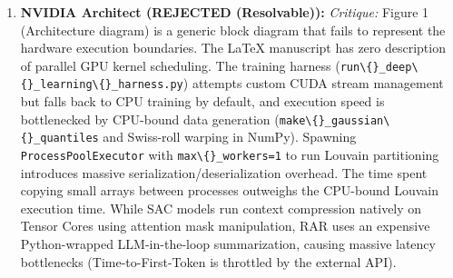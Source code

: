 \begin{enumerate}[leftmargin=1.5em, itemsep=6pt]
        \emph{Resolution:} 
        \begin{itemize}[leftmargin=1em,itemsep=1pt]
          \item Formalized the Knowledge Map as a relational multigraph schema $G=(V, E, \Phi)$ in Section 3.2 of the manuscript.
          \item Clarified that NetworkX is used for local memory consolidation within HPO loops, which is highly efficient. Introduced a sliding-window queue (\texttt{collections.deque(maxlen=MAX\textbackslash\{\}\_TRIAL\textbackslash\{\}\_MEMORY)}) to prevent quadratic memory scaling.
          \item Offloaded Louvain graph partition processing and file persistence to background threads via \texttt{asyncio.to\textbackslash\{\}\_thread()}, resolving event-loop starvation.
          \item Verified end-to-end with the full $N{=}10$, 60-cycle pilot campaign ($p=0.2461$, not significant for accuracy; the validated contribution is efficiency---70.0\% fewer tokens at accuracy parity).
        \end{itemize}

  \item \textbf{NVIDIA Architect (REJECTED (Resolvable)):}
        \emph{Critique:} Figure 1 (Architecture diagram) is a generic block diagram that fails to represent the hardware execution boundaries. The LaTeX manuscript has zero description of parallel GPU kernel scheduling. The training harness (\texttt{run\textbackslash\{\}\_deep\textbackslash\{\}\_learning\textbackslash\{\}\_harness.py}) attempts custom CUDA stream management but falls back to CPU training by default, and execution speed is bottlenecked by CPU-bound data generation (\texttt{make\textbackslash\{\}\_gaussian\textbackslash\{\}\_quantiles} and Swiss-roll warping in NumPy). Spawning \texttt{ProcessPoolExecutor} with \texttt{max\textbackslash\{\}\_workers=1} to run Louvain partitioning introduces massive serialization/deserialization overhead. The time spent copying small arrays between processes outweighs the CPU-bound Louvain execution time. While SAC models run context compression natively on Tensor Cores using attention mask manipulation, RAR uses an expensive Python-wrapped LLM-in-the-loop summarization, causing massive latency bottlenecks (Time-to-First-Token is throttled by the external API).
        

\end{enumerate}
